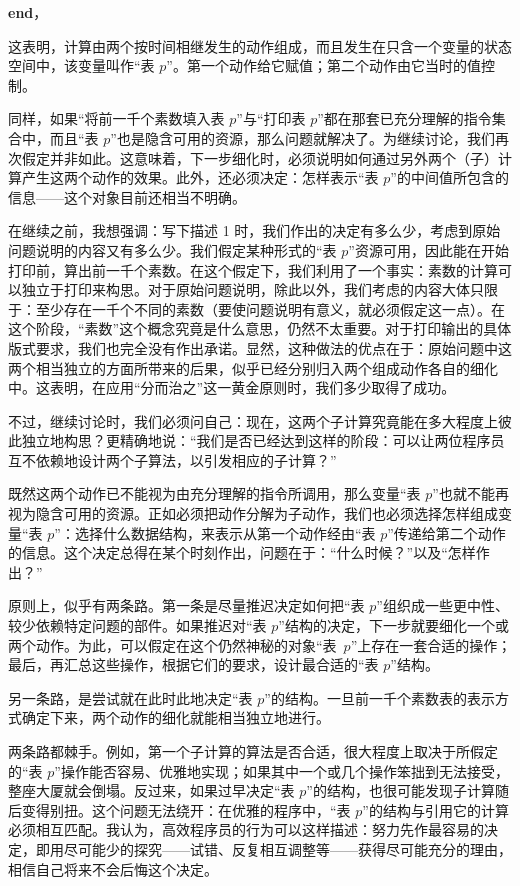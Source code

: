 \textbf{end}，

\noindent
这表明，计算由两个按时间相继发生的动作组成，而且发生在只含一个变量的状态空间中，该变量叫作“表 $p$”。第一个动作给它赋值；第二个动作由它当时的值控制。

同样，如果“将前一千个素数填入表 $p$”与“打印表 $p$”都在那套已充分理解的指令集合中，而且“表 $p$”也是隐含可用的资源，那么问题就解决了。为继续讨论，我们再次假定并非如此。这意味着，下一步细化时，必须说明如何通过另外两个（子）计算产生这两个动作的效果。此外，还必须决定：怎样表示“表 $p$”的中间值所包含的信息——这个对象目前还相当不明确。

在继续之前，我想强调：写下描述 1 时，我们作出的决定有多么少，考虑到原始问题说明的内容又有多么少。我们假定某种形式的“表 $p$”资源可用，因此能在开始打印前，算出前一千个素数。在这个假定下，我们利用了一个事实：素数的计算可以独立于打印来构思。对于原始问题说明，除此以外，我们考虑的内容大体只限于：至少存在一千个不同的素数（要使问题说明有意义，就必须假定这一点）。在这个阶段，“素数”这个概念究竟是什么意思，仍然不太重要。对于打印输出的具体版式要求，我们也完全没有作出承诺。显然，这种做法的优点在于：原始问题中这两个相当独立的方面所带来的后果，似乎已经分别归入两个组成动作各自的细化中。这表明，在应用“分而治之”这一黄金原则时，我们多少取得了成功。

不过，继续讨论时，我们必须问自己：现在，这两个子计算究竟能在多大程度上彼此独立地构思？更精确地说：“我们是否已经达到这样的阶段：可以让两位程序员互不依赖地设计两个子算法，以引发相应的子计算？”

既然这两个动作已不能视为由充分理解的指令所调用，那么变量“表 $p$”也就不能再视为隐含可用的资源。正如必须把动作分解为子动作，我们也必须选择怎样组成变量“表 $p$”：选择什么数据结构，来表示从第一个动作经由“表 $p$”传递给第二个动作的信息。这个决定总得在某个时刻作出，问题在于：“什么时候？”以及“怎样作出？”

原则上，似乎有两条路。第一条是尽量推迟决定如何把“表 $p$”组织成一些更中性、较少依赖特定问题的部件。如果推迟对“表 $p$”结构的决定，下一步就要细化一个或两个动作。为此，可以假定在这个仍然神秘的对象\mbox{“表 $p$”}上存在一套合适的操作；最后，再汇总这些操作，根据它们的要求，设计最合适的“表 $p$”结构。

另一条路，是尝试就在此时此地决定“表 $p$”的结构。一旦前一千个素数表的表示方式确定下来，两个动作的细化就能相当独立地进行。

两条路都棘手。例如，第一个子计算的算法是否合适，很大程度上取决于所假定的“表 $p$”操作能否容易、优雅地实现；如果其中一个或几个操作笨拙到无法接受，整座大厦就会倒塌。反过来，如果过早决定“表 $p$”的结构，也很可能发现子计算随后变得别扭。这个问题无法绕开：在优雅的程序中，“表 $p$”的结构与引用它的计算必须相互匹配。我认为，高效程序员的行为可以这样描述：努力先作最容易的决定，即用尽可能少的探究——试错、反复相互调整等——获得尽可能充分的理由，相信自己将来不会后悔这个决定。

